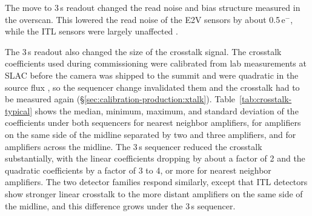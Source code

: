 The move to 3\,s readout changed the read noise and bias structure measured in the overscan.
This lowered the read noise of the E2V sensors by about 0.5\,e$^-$, while the ITL sensors were largely unaffected \citep{2026arXiv260631806M}.

The 3\,s readout also changed the size of the crosstalk signal.
The crosstalk coefficients used during commissioning were calibrated from lab measurements at SLAC before the camera was shipped to the summit and were quadratic in the source flux \citep{2021JATIS...7d48002S}, so the sequencer change invalidated them and the crosstalk had to be measured again (\S\ref{sec:calibration-production:xtalk}).
Table~\ref{tab:crosstalk-typical} shows the median, minimum, maximum, and standard deviation of the coefficients under both sequencers for nearest neighbor amplifiers, for amplifiers on the same side of the midline separated by two and three amplifiers, and for amplifiers across the midline.
The 3\,s sequencer reduced the crosstalk substantially, with the linear coefficients dropping by about a factor of 2 and the quadratic coefficients by a factor of 3 to 4, or more for nearest neighbor amplifiers.
The two detector families respond similarly, except that ITL detectors show stronger linear crosstalk to the more distant amplifiers on the same side of the midline, and this difference grows under the 3\,s sequencer.


